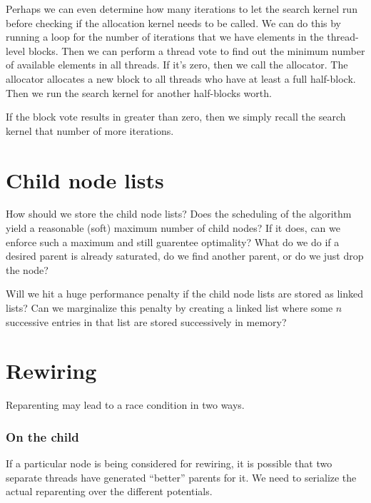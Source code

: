 Perhaps we can even determine how many iterations to let the search kernel run before checking if the allocation kernel needs to be called. We can do this by running a loop for the number of iterations that we have elements in the thread-level blocks. Then we can perform a thread vote to find out the minimum number of available elements in all threads. If it's zero, then we call the allocator. The allocator allocates a new block to all threads who have at least a full half-block. Then we run the search kernel for another half-blocks worth.

If the block vote results in greater than zero, then we simply recall the search kernel that number of more iterations.
 



\section{Child node lists}
\label{a:ChildNodeLists}
How should we store the child node lists? Does the scheduling of the algorithm yield a reasonable (soft) maximum number of child nodes? If it does, can we enforce such a maximum and still guarentee optimality? What do we do if a desired parent is already saturated, do we find another parent, or do we just drop the node?

Will we hit a huge performance penalty if the child node lists are stored as linked lists? Can we marginalize this penalty by creating a linked list where some $n$ successive entries in that list are stored successively in memory?

\begin{figure}[H]
\begin{centering}
    \texttt{[image: \\figfile\{fig/child\_list]}}
    \caption{Linked-list of arrays}
\end{centering} 
\end{figure}


\section{Rewiring}

Reparenting may lead to a race condition in two ways. 

\subsubsection{On the child}
If a particular node is being considered for rewiring, it is possible that two separate threads have generated ``better'' parents for it. We need to serialize the actual reparenting over the different potentials. 

